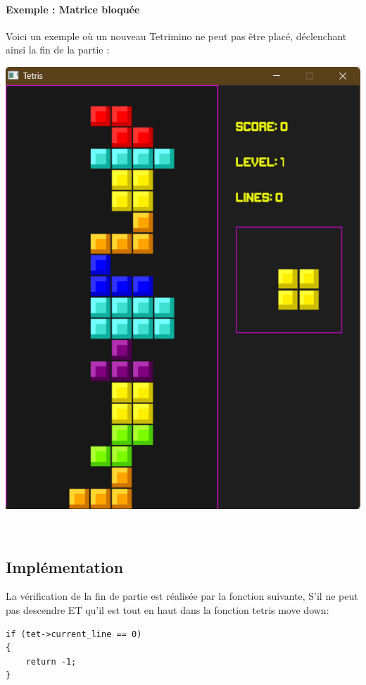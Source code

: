 \documentclass[12pt,a4paper]{report}
\begin{document}
\paragraph{Exemple : Matrice bloquée}
Voici un exemple où un nouveau Tetrimino ne peut pas être placé, déclenchant ainsi la fin de la partie :
\\
\begin{center}
\includegraphics[scale=0.5]{Figure_Presque.png} 
\end{center}
\\

\subsection{Implémentation}
La vérification de la fin de partie est réalisée par la fonction suivante, S'il ne peut pas descendre ET qu'il est tout en haut dans la fonction tetris move down:
\\
\begin{lstlisting}
if (tet->current_line == 0)
{
    return -1;
}
\end{lstlisting}
\end{document}
